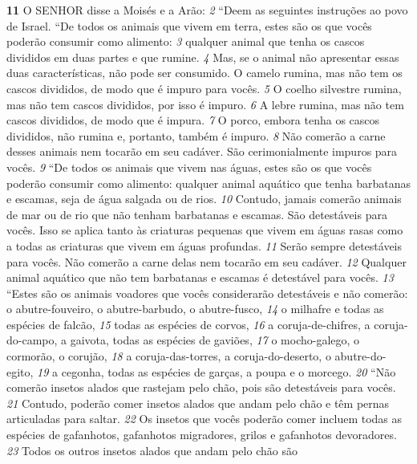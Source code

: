 \bigskip
\textbf{\large 11}
 O SENHOR disse a Moisés e a Arão: 
\textit{\tiny 2} 
“Deem as seguintes instruções ao povo
de Israel.
  “De todos os animais que vivem em terra,
 estes são os que vocês poderão
consumir como alimento: 
\textit{\tiny 3} 
qualquer animal que tenha os cascos divididos em
duas partes e que rumine. 
\textit{\tiny 4} 
Mas, se o animal não apresentar essas duas
características, não pode ser consumido. O camelo rumina, mas não tem os cascos
divididos, de modo que é impuro para vocês. 
\textit{\tiny 5} 
O coelho silvestre
 rumina, mas
não tem cascos divididos, por isso é impuro. 
\textit{\tiny 6} 
A lebre rumina, mas não tem cascos
divididos, de modo que é impura. 
\textit{\tiny 7} 
O porco, embora tenha os cascos divididos,
não rumina e, portanto, também é impuro. 
\textit{\tiny 8} 
Não comerão a carne desses animais
nem tocarão em seu cadáver. São cerimonialmente impuros para vocês. 
\textit{\tiny 9} 
“De todos os animais que vivem nas águas, estes são os que vocês poderão
consumir como alimento: qualquer animal aquático que tenha barbatanas e
escamas, seja de água salgada ou de rios. 
\textit{\tiny 10}
Contudo, jamais comerão animais de
mar ou de rio que não tenham barbatanas e escamas. São detestáveis para vocês.
Isso se aplica tanto às criaturas pequenas que vivem em águas rasas como a todas
as criaturas que vivem em águas profundas. 
\textit{\tiny 11}
Serão sempre detestáveis para
vocês. Não comerão a carne delas nem tocarão em seu cadáver. 
\textit{\tiny 12}
Qualquer
animal aquático que não tem barbatanas e escamas é detestável para vocês.
\textit{\tiny 13}
“Estes são os animais voadores que vocês considerarão detestáveis e não
comerão: o abutre-fouveiro, o abutre-barbudo, o abutre-fusco, 
\textit{\tiny 14}
o milhafre e
todas as espécies de falcão, 
\textit{\tiny 15}
todas as espécies de corvos, 
\textit{\tiny 16}
a coruja-de-chifres, a
coruja-do-campo, a gaivota, todas as espécies de gaviões, 
\textit{\tiny 17}
o mocho-galego, o
cormorão, o corujão, 
\textit{\tiny 18}
a coruja-das-torres, a coruja-do-deserto, o abutre-do-egito,
\textit{\tiny 19}
a cegonha, todas as espécies de garças, a poupa e o morcego.
\textit{\tiny 20}
“Não comerão insetos alados que rastejam pelo chão, pois são detestáveis
para vocês. 
\textit{\tiny 21}
Contudo, poderão comer insetos alados que andam pelo chão e têm
pernas articuladas para saltar. 
\textit{\tiny 22}
Os insetos que vocês poderão comer incluem
todas as espécies de gafanhotos, gafanhotos migradores, grilos e gafanhotos
devoradores. 
\textit{\tiny 23}
Todos os outros insetos alados que andam pelo chão são
